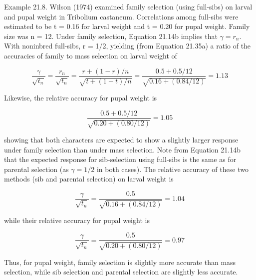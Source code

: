 \documentclass{article}
\begin{document}
Example 21.8. Wilson (1974) examined family selection (using full-sibs) on larval and pupal weight in Tribolium castaneum. Correlations among full-sibs were estimated to be t = 0.16 for larval weight and t = 0.20 for pupal weight. Family size was n = 12. Under family selection, Equation 21.14b implies that  $ \gamma = r_n $. With noninbred full-sibs, r = 1/2, yielding (from Equation 21.35a) a ratio of the accuracies of family to mass selection on larval weight of

\begin{equation}
\frac{\gamma}{\sqrt{t_{n}}}=\frac{r_{n}}{\sqrt{t_{n}}}=\frac{r+(1-r)/n}{\sqrt{t+(1-t)/n}}=\frac{0.5+0.5/12}{\sqrt{0.16+(0.84/12)}}=1.13
\end{equation}

Likewise, the relative accuracy for pupal weight is

\begin{equation}
\frac{0.5+0.5/12}{\sqrt{0.20+(0.80/12)}}=1.05
\end{equation}

showing that both characters are expected to show a slightly larger response under family selection than under mass selection. Note from Equation 21.14b that the expected response for sib-selection using full-sibs is the same as for parental selection (as  $ \gamma = 1/2 $ in both cases). The relative accuracy of these two methods (sib and parental selection) on larval weight is

\begin{equation}
\frac{\gamma}{\sqrt{t_{n}}}=\frac{0.5}{\sqrt{0.16+(0.84/12)}}=1.04
\end{equation}

while their relative accuracy for pupal weight is

\begin{equation}
\frac{\gamma}{\sqrt{t_{n}}}=\frac{0.5}{\sqrt{0.20+(0.80/12)}}=0.97
\end{equation}

Thus, for pupal weight, family selection is slightly more accurate than mass selection, while sib selection and parental selection are slightly less accurate.
\end{document}
